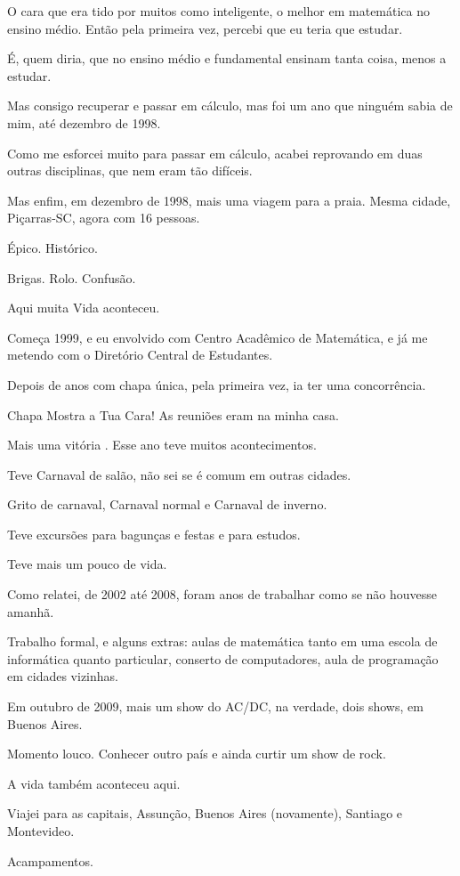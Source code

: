 O cara que era tido por muitos como inteligente, o melhor em matemática no ensino médio. Então pela primeira vez, percebi que eu teria que estudar. 

É, quem diria, que no ensino médio e fundamental ensinam tanta coisa, menos a estudar. 

Mas consigo recuperar e passar em cálculo, mas foi um ano que ninguém sabia de mim, até dezembro de 1998.
 
Como me esforcei muito para passar em cálculo, acabei reprovando em duas outras disciplinas, que nem eram tão difíceis.

Mas enfim, em dezembro de 1998, mais uma viagem para a praia. Mesma cidade, Piçarras-SC, agora com 16 pessoas. 

Épico. Histórico. 

Brigas. Rolo. Confusão. 

Aqui muita Vida aconteceu.

Começa 1999, e eu envolvido com Centro Acadêmico de Matemática, e já me metendo com o Diretório Central de Estudantes. 

Depois de anos com chapa única, pela primeira vez, ia ter uma concorrência.  

Chapa Mostra a Tua Cara! As reuniões eram na minha casa.

Mais uma vitória
. 
Esse ano teve muitos acontecimentos. 

Teve Carnaval de salão, não sei se é comum em outras cidades. 

Grito de carnaval, Carnaval normal e Carnaval de inverno. 

Teve excursões para bagunças e festas e para estudos. 

Teve mais um pouco de vida.

Como relatei, de 2002 até 2008, foram anos de trabalhar como se não houvesse amanhã.

Trabalho formal, e alguns extras: aulas de matemática tanto em uma escola de informática quanto particular, conserto de computadores, aula de programação em cidades vizinhas.
	
Em outubro de 2009, mais um show do AC/DC, na verdade, dois shows, em Buenos Aires.

Momento louco. Conhecer outro país e ainda curtir um show de rock. 

A vida também aconteceu aqui.

Viajei para as capitais, Assunção, Buenos Aires (novamente), Santiago e Montevideo.

Acampamentos.

